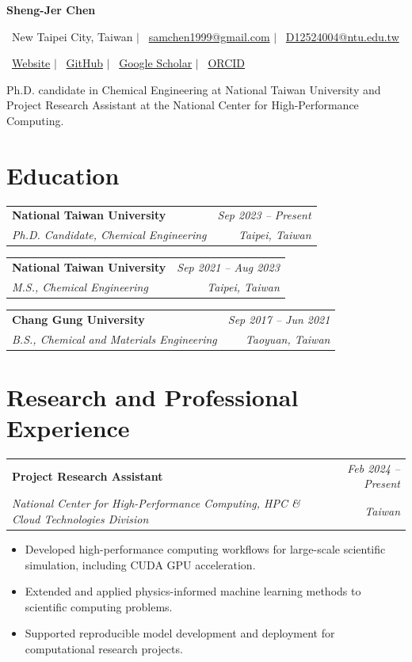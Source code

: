 \documentclass[11pt,letterpaper]{article}
\makeatletter
\newcommand{\nameheader}[1]{
  {\fontsize{22}{24}\selectfont\bfseries #1}\par
}
\newcommand{\contactline}[1]{
  {\small\color{textgray}#1}\par
}
\newcommand{\datedsubsection}[4]{
  \vspace{0.2em}
  \begin{tabularx}{\textwidth}{@{}Xr@{}}
    \textbf{#1} & \textit{#2} \\
    \textit{#3} & \textit{#4} \\
  \end{tabularx}
}
\newenvironment{tightitemize}{
  \begin{itemize}[leftmargin=1.25em, itemsep=0.15em, topsep=0.2em, parsep=0em, partopsep=0em]
}{
  \end{itemize}
}
\makeatother
\begin{document}
\nameheader{Sheng-Jer Chen}
\contactline{
  \faMapMarker* \ New Taipei City, Taiwan
  \quad $\vert$ \quad
  \faEnvelope \ \href{mailto:samchen1999@gmail.com}{samchen1999@gmail.com}
  \quad $\vert$ \quad
  \faEnvelopeOpenText \ \href{mailto:D12524004@ntu.edu.tw}{D12524004@ntu.edu.tw}
}
\contactline{
  \faGlobe \ \href{https://ShengJer.github.io}{Website}
  \quad $\vert$ \quad
  \faGithub \ \href{https://github.com/ShengJer}{GitHub}
  \quad $\vert$ \quad
  \faGraduationCap \ \href{https://scholar.google.com/citations?user=FzvqI3gAAAAJ&hl=en}{Google Scholar}
  \quad $\vert$ \quad
  \faIdBadge \ \href{https://orcid.org/0009-0006-6613-5209}{ORCID}
}

\vspace{0.6em}
{\small
Ph.D. candidate in Chemical Engineering at National Taiwan University and Project Research Assistant at the National Center for High-Performance Computing.
}

\section*{Education}
\datedsubsection
  {National Taiwan University}{Sep 2023 -- Present}
  {Ph.D. Candidate, Chemical Engineering}{Taipei, Taiwan}

\datedsubsection
  {National Taiwan University}{Sep 2021 -- Aug 2023}
  {M.S., Chemical Engineering}{Taipei, Taiwan}

\datedsubsection
  {Chang Gung University}{Sep 2017 -- Jun 2021}
  {B.S., Chemical and Materials Engineering}{Taoyuan, Taiwan}

\section*{Research and Professional Experience}
\datedsubsection
  {Project Research Assistant}{Feb 2024 -- Present}
  {National Center for High-Performance Computing, HPC \& Cloud Technologies Division}{Taiwan}
\begin{tightitemize}
  \item Developed high-performance computing workflows for large-scale scientific simulation, including CUDA GPU acceleration.
  \item Extended and applied physics-informed machine learning methods to scientific computing problems.
  \item Supported reproducible model development and deployment for computational research projects.
\end{tightitemize}
\end{document}
